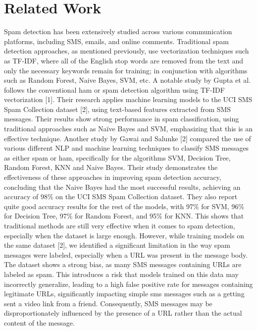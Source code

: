 \documentclass{article}
\begin{document}
\section{Related Work}
Spam detection has been extensively studied across various communication platforms, including SMS, emails, and online comments. Traditional spam detection approaches, as mentioned previously, use vectorization techniques such as TF-IDF, where all of the English stop words are removed from the text and only the necessary keywords remain for training; in conjunction with algorithms such as Random Forest, Naive Bayes, SVM, etc.
\newline
\newline
A notable study by Gupta et al. follows the conventional ham or spam detection algorithm using TF-IDF vectorization [1]. Their research applies machine learning models to the UCI SMS Spam Collection dataset [2], using text-based features extracted from SMS messages. Their results show strong performance in spam classification, using traditional approaches such as Naïve Bayes and SVM, emphasizing that this is an effective technique.
\newline
\newline
Another study by Gawai and Salunke [2] compared the use of various different NLP and machine learning techniques to classify SMS messages as either spam or ham, specifically for the algorithms SVM, Decision Tree, Random Forest, KNN and Naive Bayes. Their study demonstrates the effectiveness of these approaches in improving spam detection accuracy, concluding that the Naive Bayes had the most successful results, achieving an accuracy of 98\% on the UCI SMS Spam Collection dataset. They also report quite good accuracy results for the rest of the models, with 97\% for SVM, 96\% for Decision Tree, 97\% for Random Forest, and 95\% for KNN. This shows that traditional methods are still very effective when it comes to spam detection, especially when the dataset is large enough.
\newline
\newline
However, while training models on the same dataset [2], we identified a significant limitation in the way spam messages were labeled, especially when a URL was present in the message body. The dataset shows a strong bias, as many SMS messages containing URLs are labeled as spam. This introduces a risk that models trained on this data may incorrectly generalize, leading to a high false positive rate for messages containing legitimate URLs, significantly impacting simple sms messages such as a getting sent a video link from a friend. Consequently, SMS messages may be disproportionately influenced by the presence of a URL rather than the actual content of the message.
\end{document}
